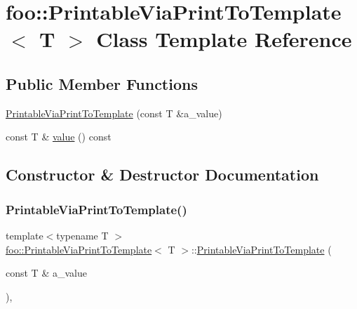\hypertarget{classfoo_1_1_printable_via_print_to_template}{}\section{foo\+:\+:Printable\+Via\+Print\+To\+Template$<$ T $>$ Class Template Reference}
\label{classfoo_1_1_printable_via_print_to_template}
\subsection*{Public Member Functions}
\begin{DoxyCompactItemize}
\item 
\hyperlink{classfoo_1_1_printable_via_print_to_template_a8fef9e8b59c9415624230b73469b517e}{Printable\+Via\+Print\+To\+Template} (const T \&a\+\_\+value)
\item 
const T \& \hyperlink{classfoo_1_1_printable_via_print_to_template_a14e0fcac9ae264e37e6212994b2920f6}{value} () const
\end{DoxyCompactItemize}


\subsection{Constructor \& Destructor Documentation}
\mbox{\label{classfoo_1_1_printable_via_print_to_template_a8fef9e8b59c9415624230b73469b517e}} 
\subsubsection{\texorpdfstring{Printable\+Via\+Print\+To\+Template()}{PrintableViaPrintToTemplate()}}
{\footnotesize\ttfamily template$<$typename T $>$ \\
\hyperlink{classfoo_1_1_printable_via_print_to_template}{foo\+::\+Printable\+Via\+Print\+To\+Template}$<$ T $>$\+::\hyperlink{classfoo_1_1_printable_via_print_to_template}{Printable\+Via\+Print\+To\+Template} (\begin{DoxyParamCaption}\item[{const T \&}]{a\+\_\+value }\end{DoxyParamCaption})\hspace{0.3cm}{\ttfamily [inline]}, {\ttfamily [explicit]}}



